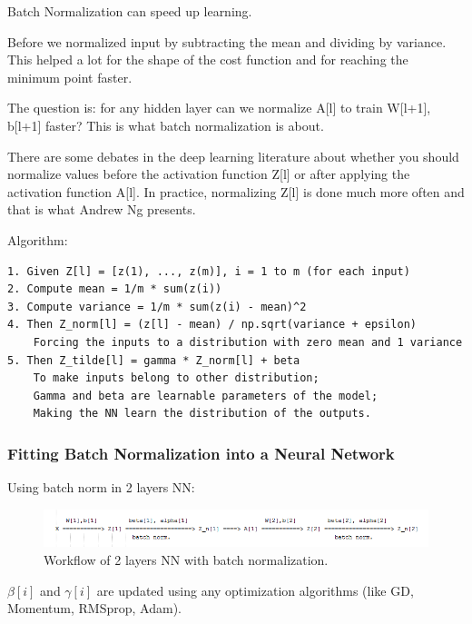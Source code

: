 Batch Normalization can speed up learning.

Before we normalized input by subtracting the mean and dividing by variance. This helped a lot for the shape of the cost function and for reaching the minimum point faster.

The question is: for any hidden layer can we normalize A[l] to train W[l+1], b[l+1] faster? This is what batch normalization is about.

There are some debates in the deep learning literature about whether you should normalize values before the activation function Z[l] or after applying the activation function A[l]. In practice, normalizing Z[l] is done much more often and that is what Andrew Ng presents.


Algorithm:

\begin{lstlisting}
1. Given Z[l] = [z(1), ..., z(m)], i = 1 to m (for each input)
2. Compute mean = 1/m * sum(z(i))
3. Compute variance = 1/m * sum(z(i) - mean)^2
4. Then Z_norm[l] = (z[l] - mean) / np.sqrt(variance + epsilon) 
    Forcing the inputs to a distribution with zero mean and 1 variance
5. Then Z_tilde[l] = gamma * Z_norm[l] + beta 
    To make inputs belong to other distribution; 
    Gamma and beta are learnable parameters of the model; 
    Making the NN learn the distribution of the outputs.
\end{lstlisting}

\subsubsection{Fitting Batch Normalization into a Neural Network}
Using batch norm in 2 layers NN:

\begin{figure}[!hbtp]
    \centering
    \includegraphics[width=1.0\textwidth]{img/c2/bn.png}
    \caption{Workflow of 2 layers NN with batch normalization.}
    \label{fig:my_label}
\end{figure}

$\beta[i]$ and $\gamma[i]$ are updated using any optimization algorithms (like GD, Momentum, RMSprop, Adam).

